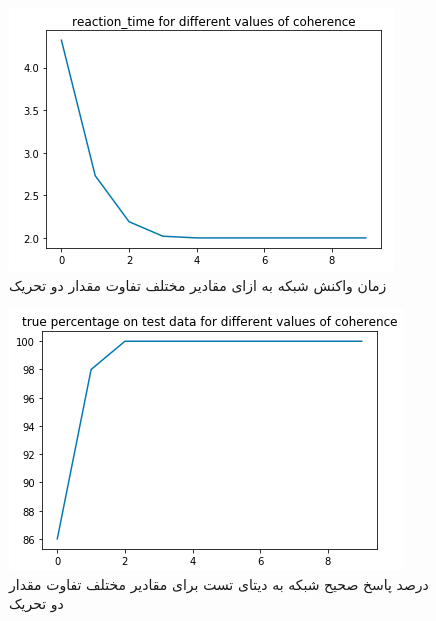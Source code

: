 \documentclass[a4paper]{article}
\begin{document}
\begin{figure}[h!]
	\centering
	\includegraphics[scale=0.7]{fig03.png}
	\caption{زمان واکنش شبکه به ازای مقادیر مختلف تفاوت مقدار دو تحریک}
	\label{fig03}
\end{figure}


\begin{figure}[h!]
	\centering
	\includegraphics[scale=0.7]{fig04.png}
	\caption{درصد پاسخ صحیح شبکه به دیتای تست برای مقادیر مختلف تفاوت مقدار دو تحریک}
	\label{fig04}
\end{figure}
\end{document}
